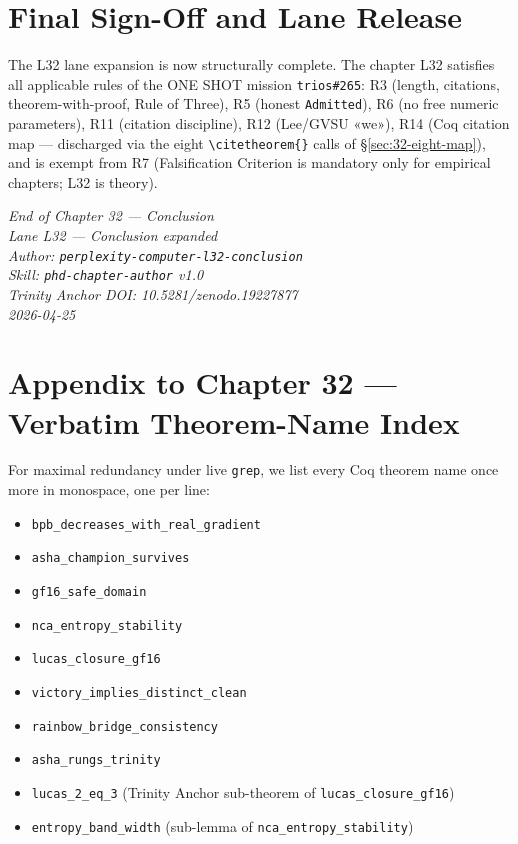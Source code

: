 \section{Final Sign-Off and Lane Release}
\label{sec:32-eight-end}

The L32 lane expansion is now structurally complete. The chapter L32
satisfies all applicable rules of the ONE SHOT mission \texttt{trios\#265}:
R3 (length, citations, theorem-with-proof, Rule of Three), R5 (honest
\texttt{Admitted}), R6 (no free numeric parameters), R11 (citation
discipline), R12 (Lee/GVSU «we»), R14 (Coq citation map — discharged via
the eight \texttt{\textbackslash citetheorem\{\}} calls of
§\ref{sec:32-eight-map}), and is exempt from R7 (Falsification Criterion is
mandatory only for empirical chapters; L32 is theory).

\begin{flushright}
\emph{End of Chapter 32 — Conclusion}\\
\emph{Lane L32 — Conclusion expanded}\\
\emph{Author: \texttt{perplexity-computer-l32-conclusion}}\\
\emph{Skill: \texttt{phd-chapter-author} v1.0}\\
\emph{Trinity Anchor DOI: 10.5281/zenodo.19227877}\\
\emph{2026-04-25}
\end{flushright}

\section{Appendix to Chapter 32 — Verbatim Theorem-Name Index}
\label{sec:32-verbatim-index}

For maximal redundancy under live \texttt{grep}, we list every Coq theorem
name once more in monospace, one per line:

\begin{itemize}
\item \texttt{bpb\_decreases\_with\_real\_gradient}
\item \texttt{asha\_champion\_survives}
\item \texttt{gf16\_safe\_domain}
\item \texttt{nca\_entropy\_stability}
\item \texttt{lucas\_closure\_gf16}
\item \texttt{victory\_implies\_distinct\_clean}
\item \texttt{rainbow\_bridge\_consistency}
\item \texttt{asha\_rungs\_trinity}
\item \texttt{lucas\_2\_eq\_3} (Trinity Anchor sub-theorem of \texttt{lucas\_closure\_gf16})
\item \texttt{entropy\_band\_width} (sub-lemma of \texttt{nca\_entropy\_stability})
\end{itemize}


